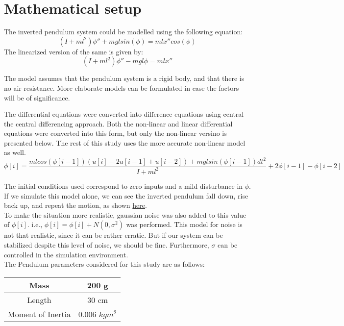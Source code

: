 \section{Mathematical setup}

The inverted pendulum system could be modelled using the following equation: $$(I + ml^2)\phi'' + mgl sin(\phi) = mlx'' cos(\phi) $$
The linearized version of the same is given by: $$ (I + ml^2)\phi'' - mgl\phi = mlx'' $$

The model assumes that the pendulum system is a rigid body, and that there is no air resistance. More elaborate models can be formulated in case the factors will be of significance.

\pagebreak

The differential equations were converted into difference equations using central the central differencing approach. Both the non-linear and linear differential equations were converted into this form, but only the non-linear versino is presented below. The rest of this study uses the more accurate non-linear model as well. $$ \phi[i] = \frac{mlcos(\phi[i-1])(u[i]-2u[i-1]+u[i-2])+mglsin(\phi[i-1])dt^2}{I+ml^2}+2\phi[i-1]-\phi[i-2] $$

The initial conditions used correspond to zero inputs and a mild disturbance in $\phi$. If we simulate this model alone, we can see the inverted pendulum fall down, rise back up, and repeat the motion, as shown \href{https://drive.google.com/file/d/1yxK98jd5MMN-ZS-9CXhYLmzXG_MvcPZX/view?usp=sharing}{here}. \\

To make the situation more realistic, gaussian noise was also added to this value of $\phi[i]$. i.e., $\phi[i] = \phi[i] + N(0,\sigma^2)$ was performed. This model for noise is not that realistic, since it can be rather erratic. But if our system can be stabilized despite this level of noise, we should be fine. Furthermore, $\sigma$ can be controlled in the simulation environment. \\

The Pendulum parameters considered for this study are as follows: \cite{ref2}
\begin{center}
\begin{tabular}{ | c | c | }
	\hline
	Mass 			& 	200 g \\
	\hline
	Length 			&	30 cm \\  
	\hline
	Moment of Inertia	&	0.006 $kg m^2$ \\
	\hline
\end{tabular}
\end{center}